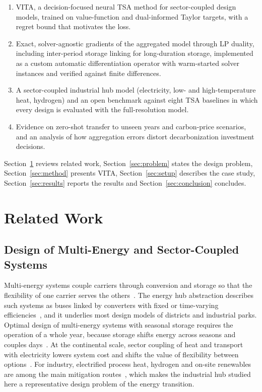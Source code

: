 \documentclass[journal]{IEEEtran}
\begin{document}
\begin{enumerate}
\item VITA, a decision-focused neural TSA method for sector-coupled design models, trained on value-function and dual-informed Taylor targets, with a regret bound that motivates the loss.
\item Exact, solver-agnostic gradients of the aggregated model through LP duality, including inter-period storage linking for long-duration storage, implemented as a custom automatic differentiation operator with warm-started solver instances and verified against finite differences.
\item A sector-coupled industrial hub model (electricity, low- and high-temperature heat, hydrogen) and an open benchmark against eight TSA baselines in which every design is evaluated with the full-resolution model.
\item Evidence on zero-shot transfer to unseen years and carbon-price scenarios, and an analysis of how aggregation errors distort decarbonization investment decisions.
\end{enumerate}

Section~\ref{sec:related} reviews related work, Section~\ref{sec:problem} states the design problem, Section~\ref{sec:method} presents VITA, Section~\ref{sec:setup} describes the case study, Section~\ref{sec:results} reports the results and Section~\ref{sec:conclusion} concludes.

\section{Related Work}\label{sec:related}

\subsection{Design of Multi-Energy and Sector-Coupled Systems}
Multi-energy systems couple carriers through conversion and storage so that the flexibility of one carrier serves the others~\cite{mancarella2014mes}. The energy hub abstraction describes such systems as buses linked by converters with fixed or time-varying efficiencies~\cite{geidl2007energyhubs}, and it underlies most design models of districts and industrial parks. Optimal design of multi-energy systems with seasonal storage requires the operation of a whole year, because storage shifts energy across seasons and couples days~\cite{gabrielli2018seasonal}. At the continental scale, sector coupling of heat and transport with electricity lowers system cost and shifts the value of flexibility between options~\cite{brown2018synergies}. For industry, electrified process heat, hydrogen and on-site renewables are among the main mitigation routes~\cite{rissman2020industry}, which makes the industrial hub studied here a representative design problem of the energy transition.
\end{document}
